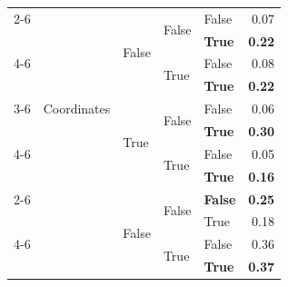 \documentclass{article}
\begin{document}
\begin{table}
\begin{center}
{\begin{tabular}{@{}lllllr@{}}
    \cmidrule{2-6}
                                                & \multirow[c]{9}{*}{Coordinates}   & \multirow[c]{4}{*}{False} & \multirow[c]{2}{*}{False} & False                 & 0.07 \\
                                                &                                   &                           &                           & \textbf{True}         & \textbf{0.22} \\
    \cmidrule{4-6}
                                                &                                   &                           & \multirow[c]{2}{*}{True}  & False                 & 0.08 \\
                                                &                                   &                           &                           & \textbf{True}         & \textbf{0.22} \\
    \cmidrule{3-6}
                                                &                                   & \multirow[c]{4}{*}{True}  & \multirow[c]{2}{*}{False} & False                 & 0.06 \\
                                                &                                   &                           &                           & \textbf{True}         & \textbf{0.30} \\
    \cmidrule{4-6}
                                                &                                   &                           & \multirow[c]{2}{*}{True}  & False                 & 0.05 \\
                                                &                                   &                           &                           & \textbf{True}         & \textbf{0.16} \\
    \cmidrule{2-6}
                                                & \multirow[c]{9}{*}{RGB}           & \multirow[c]{4}{*}{False} & \multirow[c]{2}{*}{False} & \textbf{False}        & \textbf{0.25} \\
                                                &                                   &                           &                           & True                  & 0.18 \\
    \cmidrule{4-6}
                                                &                                   &                           & \multirow[c]{2}{*}{True}  & False                 & 0.36 \\
                                                &                                   &                           &                           & \textbf{True}         & \textbf{0.37} \\

\end{tabular}}
\end{center}
\end{table}
\end{document}
